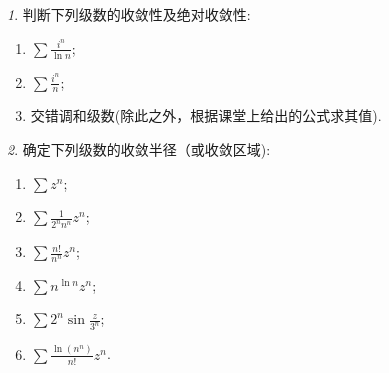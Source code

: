 \documentclass[11pt]{article}
\theoremstyle{remark}
\newtheorem{problem}{}
\begin{document}
\begin{problem}
  判断下列级数的收敛性及绝对收敛性:
  \begin{enumerate}
    \item $\sum \frac{i^n}{\ln n}$;
    \item $\sum \frac{i^n}{n}$;
    \item  交错调和级数(除此之外，根据课堂上给出的公式求其值).
  \end{enumerate}
\end{problem}


\begin{problem}
  确定下列级数的收敛半径（或收敛区域):
  \begin{enumerate}
    \item $\sum z^n$;
    \item $\sum \frac{1}{2^n n^n} z^n$;
    \item $\sum \frac{n !}{n^n} z^n$;
    \item $\sum n^{\ln{n}} z^n$;
    \item $\sum 2^n \sin \frac{z}{3^n}$;
    \item $\sum \frac{\ln \left(n^n\right)}{n !} z^n$.
  \end{enumerate}
\end{problem}






\end{document}
